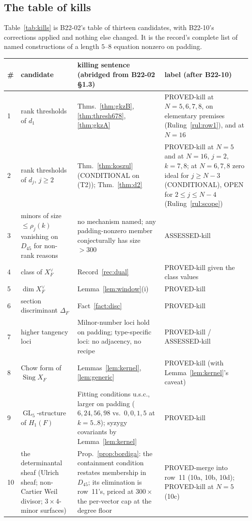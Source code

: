 \documentclass[11pt]{amsart}
\theoremstyle{plain}
\theoremstyle{definition}
\theoremstyle{remark}
\DeclareMathOperator{\GL}{GL}
\DeclareMathOperator{\Sing}{Sing}
\newcommand{\Dff}{D_{45}}
\begin{document}
\subsection{The table of kills}
Table~\ref{tab:kills} is B22-02's table of thirteen candidates, with B22-10's corrections applied
and nothing else changed. It is the record's complete list of named constructions of a length
$5$--$8$ equation nonzero on padding.

\begin{table}[ht]
\centering\footnotesize
\begin{tabular}{@{}p{0.4cm}p{4.3cm}p{6.4cm}p{3.2cm}@{}}
\toprule
\# & candidate & killing sentence (abridged from B22-02 \S1.3) & label (after B22-10) \\
\midrule
1 & rank thresholds of $d_1$ & Thms.~\ref{thm:gkzB}, \ref{thm:thresh678}, \ref{thm:gkzA} & PROVED-kill at $N=5,6,7,8$, on elementary premises (Ruling~\ref{rul:row1}), and at $N=16$ \\
2 & rank thresholds of $d_j$, $j\ge2$ & Thm.~\ref{thm:koszul} (CONDITIONAL on (T2)); Thm.~\ref{thm:d2} & PROVED-kill at $N=5$ and at $N=16$, $j=2$, $k=7,8$; at $N=6,7,8$ zero ideal for $j\ge N-3$ (CONDITIONAL), OPEN for $2\le j\le N-4$ (Ruling~\ref{rul:scope}) \\
3 & minors of size $\le\rho_j(k)$ vanishing on $\Dff$ for non-rank reasons & no mechanism named; any padding-nonzero member conjecturally has size $>300$ & ASSESSED-kill \\
4 & class of $X_F^\vee$ & Record~\ref{rec:dual} & PROVED-kill given the class values \\
5 & $\dim X_F^\vee$ & Lemma~\ref{lem:window}(i) & PROVED-kill \\
6 & section discriminant $\Delta_F$ & Fact~\ref{fact:disc} & PROVED-kill \\
7 & higher tangency loci & Milnor-number loci hold on padding; type-specific loci: no adjacency, no recipe & PROVED-kill / ASSESSED-kill \\
8 & Chow form of $\Sing X_F$ & Lemmas~\ref{lem:kernel}, \ref{lem:generic} & PROVED-kill (with Lemma~\ref{lem:kernel}'s caveat) \\
9 & $\GL_5$-structure of $H_1(F)$ & Fitting conditions u.s.c., larger on padding ($6,24,56,98$ vs.\ $0,0,1,5$ at $k=5..8$); syzygy covariants by Lemma~\ref{lem:kernel} & PROVED-kill \\
10 & the determinantal sheaf (Ulrich sheaf; non-Cartier Weil divisor; $3\times4$-minor surfaces) & Prop.~\ref{prop:bordiga}: the containment condition restates membership in $\Dff$; its elimination is row~11's, priced at $300\times$ the per-vector cap at the degree floor & PROVED-merge into row~11 (10a, 10b, 10d); PROVED-kill at $N=5$ (10c) \\

\end{tabular}
\end{table}
\end{document}
